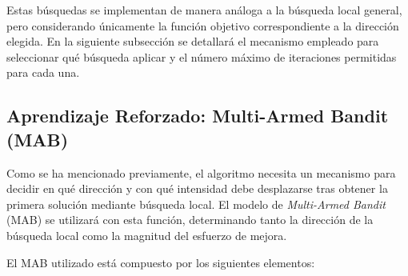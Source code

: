 \documentclass[12pt,a4paper]{book}
\begin{document}
Estas búsquedas se implementan de manera análoga a la búsqueda local general, pero considerando únicamente la función objetivo correspondiente a la dirección elegida. En la siguiente subsección se detallará el mecanismo empleado para seleccionar qué búsqueda aplicar y el número máximo de iteraciones permitidas para cada una.

\subsection{Aprendizaje Reforzado: Multi-Armed Bandit (MAB)}
Como se ha mencionado previamente, el algoritmo necesita un mecanismo para decidir en qué dirección y con qué intensidad debe desplazarse tras obtener la primera solución mediante búsqueda local. El modelo de \textit{Multi-Armed Bandit} (MAB) se utilizará con esta función, determinando tanto la dirección de la búsqueda local como la magnitud del esfuerzo de mejora.

El MAB utilizado está compuesto por los siguientes elementos:
\end{document}

